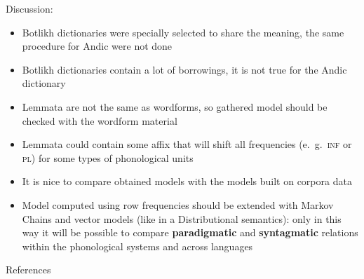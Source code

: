 \documentclass[13pt, t]{beamer}
\begin{document}
\begin{frame}{Discussion:}
\begin{itemize}
\item Botlikh dictionaries were specially selected to share the meaning, the same procedure for Andic were not done
\item Botlikh dictionaries contain a lot of borrowings, it is not true for the Andic dictionary
\item Lemmata are not the same as wordforms, so gathered model should be checked with the wordform material
\item Lemmata could contain some affix that will shift all frequencies (e.~g.~\textsc{inf} or \textsc{pl}) for some types of phonological units
\item It is nice to compare obtained models with the models built on corpora data
\item Model computed using row frequencies should be extended with Markov Chains and vector models (like in a Distributional semantics)\pause: only in this way it will be possible to compare \textbf{paradigmatic} and \textbf{syntagmatic} relations within the phonological systems and across languages
\end{itemize}
\end{frame}



\begin{frame}{References}
\footnotesize


\end{frame}
\end{document}
